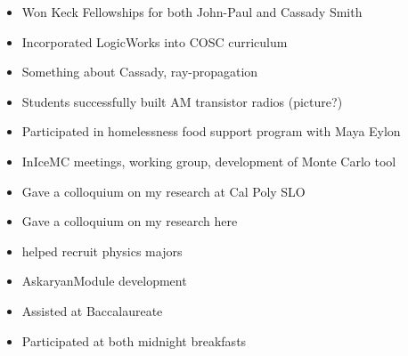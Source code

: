 \begin{itemize}
\item Won Keck Fellowships for both John-Paul and Cassady Smith
\item Incorporated LogicWorks into COSC curriculum
\item Something about Cassady, ray-propagation
\item Students successfully built AM transistor radios (picture?)
\item Participated in homelessness food support program with Maya Eylon
\item InIceMC meetings, working group, development of Monte Carlo tool
\item Gave a colloquium on my research at Cal Poly SLO
\item Gave a colloquium on my research here
\item helped recruit physics majors
\item AskaryanModule development
\item Assisted at Baccalaureate
\item Participated at both midnight breakfasts
\end{itemize}
